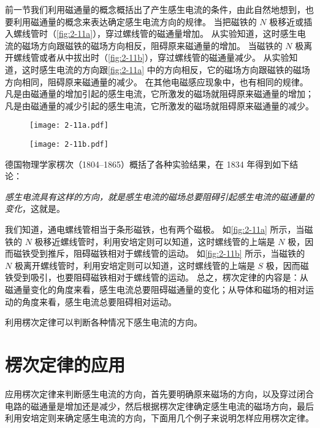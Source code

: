 前一节我们利用磁通量的概念概括出了产生感生电流的条件，由此自然地想到，也要利用磁通量的概念来表达确定感生电流方向的规律。
当把磁铁的 $N$ 极移近或插入螺线管时（\cref{fig:2-11a}），穿过螺线管的磁通量增加。
从实验知道，这时感生电流的磁场方向跟磁铁的磁场方向相反，阻碍原来磁通量的增加。
当磁铁的 $N$ 极离开螺线管或者从中拔出时（\cref{fig:2-11b}），穿过螺线管的磁通量减少。
从实验知道，这时感生电流的方向跟\cref{fig:2-11a} 中的方向相反，它的磁场方向跟磁铁的磁场方向相同，阻碍原来磁通量的减少。
在其他电磁感应现象中，也有相同的规律。
凡是由磁通量的增加引起的感生电流，它所激发的磁场就阻碍原来磁通量的增加；凡是由磁通量的减少引起的感生电流，它所激发的磁场就阻碍原来磁通量的减少。
\begin{figure}
  \begin{minipage}[b]{0.4\linewidth}\centering
    \texttt{[image: 2-11a.pdf]}
    \subcaption{}\label{fig:2-11a}
  \end{minipage}
  \begin{minipage}[b]{0.4\linewidth}\centering
    \texttt{[image: 2-11b.pdf]}
    \subcaption{}\label{fig:2-11b}
  \end{minipage}
  \caption{}\label{fig:2-11}
\end{figure}

德国物理学家楞次（1804--1865）概括了各种实验结果，在 1834 年得到如下结论：

\emph{感生电流具有这样的方向，就是感生电流的磁场总要阻碍引起感生电流的磁通量的变化}，这就是。

我们知道，通电螺线管相当于条形磁铁，也有两个磁极。
如\cref{fig:2-11a} 所示，当磁铁的 $N$ 极移近螺线管时，利用安培定则可以知道，这时螺线管的上端是 $N$ 极，因而磁铁受到推斥，阻碍磁铁相对于螺线管的运动。
如\cref{fig:2-11b} 所示，当磁铁的 $N$ 极离开螺线管时，利用安培定则可以知道，这时螺线管的上端是 $S$ 极，因而磁铁受到吸引，也要阻碍磁铁相对于螺线管的运动。
总之，楞次定律的内容是：从磁通量变化的角度来看，感生电流总要阻碍磁通量的变化；从导体和磁场的相对运动的角度来看，感生电流总要阻碍相对运动。

利用楞次定律可以判断各种情况下感生电流的方向。

\section{楞次定律的应用}
应用楞次定律来判断感生电流的方向，首先要明确原来磁场的方向，以及穿过闭合电路的磁通量是增加还是减少，然后根据楞次定律确定感生电流的磁场方向，最后利用安培定则来确定感生电流的方向，下面用几个例子来说明怎样应用楞次定律。

